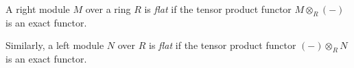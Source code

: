 \documentclass{article}
\begin{document}
A right module $M$ over a ring $R$ is {\it flat}
if the tensor product functor $M \otimes_R (-)$ 
is an exact functor.

Similarly, a left module $N$ over $R$ is {\it flat}
if the tensor product functor $(-) \otimes_R N$ 
is an exact functor.
\end{document}
